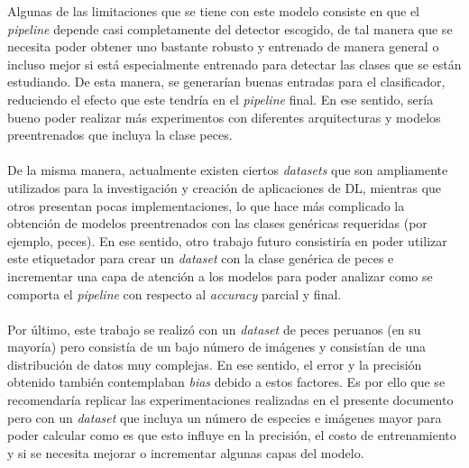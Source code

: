 Algunas de las limitaciones que se tiene con este modelo consiste en que el 
\textit{pipeline} depende casi completamente del detector escogido, de tal 
manera que se necesita poder obtener uno bastante robusto y entrenado de 
manera general o incluso mejor si está especialmente entrenado para detectar 
las clases que se están estudiando. De esta manera, se generarían buenas 
entradas para el clasificador, reduciendo el efecto que este tendría en el 
\textit{pipeline} final. En ese sentido, sería bueno poder realizar más 
experimentos con diferentes arquitecturas y modelos preentrenados que incluya 
la clase peces.
\\\\
De la misma manera, actualmente existen ciertos \textit{datasets} que son 
ampliamente utilizados para la investigación y creación de aplicaciones de 
DL, mientras que otros presentan pocas implementaciones, lo que hace más 
complicado la obtención de modelos preentrenados con las clases genéricas 
requeridas (por ejemplo, peces). En ese sentido, otro trabajo futuro 
consistiría en poder utilizar este etiquetador para crear un \textit{dataset} 
con la clase genérica de peces e incrementar una capa de atención a los modelos 
para poder analizar como se comporta el \textit{pipeline} con respecto al 
\textit{accuracy} parcial y final.   
\\\\
Por último, este trabajo se realizó con un \textit{dataset} de peces peruanos 
(en su mayoría) pero consistía de un bajo número de imágenes y consistían de 
una distribución de datos muy complejas. En ese sentido, el error y la 
precisión obtenido también contemplaban \textit{bias} debido a estos factores. 
Es por ello que se recomendaría replicar las experimentaciones realizadas en 
el presente documento pero con un \textit{dataset} que incluya un número de 
especies e imágenes mayor para poder calcular como es que esto influye en la 
precisión, el costo de entrenamiento y si se necesita mejorar o incrementar 
algunas capas del modelo.
